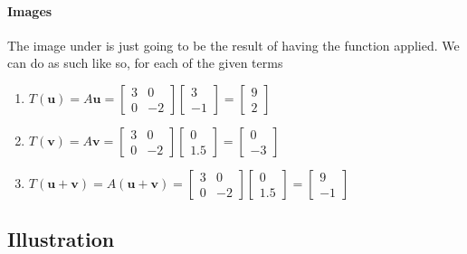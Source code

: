 \documentclass{article}
\begin{document}
        \paragraph{Images}
            The image under is just going to be the result of having the function
            applied. We can do as such like so, for each of the given terms
            \begin{enumerate}
                \item 
                    $T(\mathbf{u}) = A\mathbf{u} = \begin{bmatrix}3 & 0\\0 & -2\end{bmatrix}\begin{bmatrix}3\\-1\end{bmatrix} = \begin{bmatrix}9\\2\end{bmatrix}$
                \item 
                    $T(\mathbf{v}) = A\mathbf{v} = \begin{bmatrix}3 & 0\\0 & -2\end{bmatrix}\begin{bmatrix}0\\1.5\end{bmatrix} = \begin{bmatrix}0\\-3\end{bmatrix}$
                \item 
                    $T(\mathbf{u}+\mathbf{v}) = A(\mathbf{u}+\mathbf{v}) = \begin{bmatrix}3 & 0\\0 & -2\end{bmatrix}\begin{bmatrix}0\\1.5\end{bmatrix} = \begin{bmatrix}9\\-1\end{bmatrix}$
            \end{enumerate}
    \newpage
    \subsection{Illustration}
\end{document}
